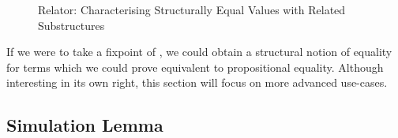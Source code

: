 \begin{figure}[h]
\caption{Relator: Characterising Structurally Equal Values with Related Substructures\label{fig:zip-rel}}
\end{figure}

If we were to take a fixpoint of , we could obtain a structural
notion of equality for terms which we could prove equivalent to propositional
equality. Although interesting in its own right, this section will focus
on more advanced use-cases.



\subsection{Simulation Lemma}\label{section:simulation}

